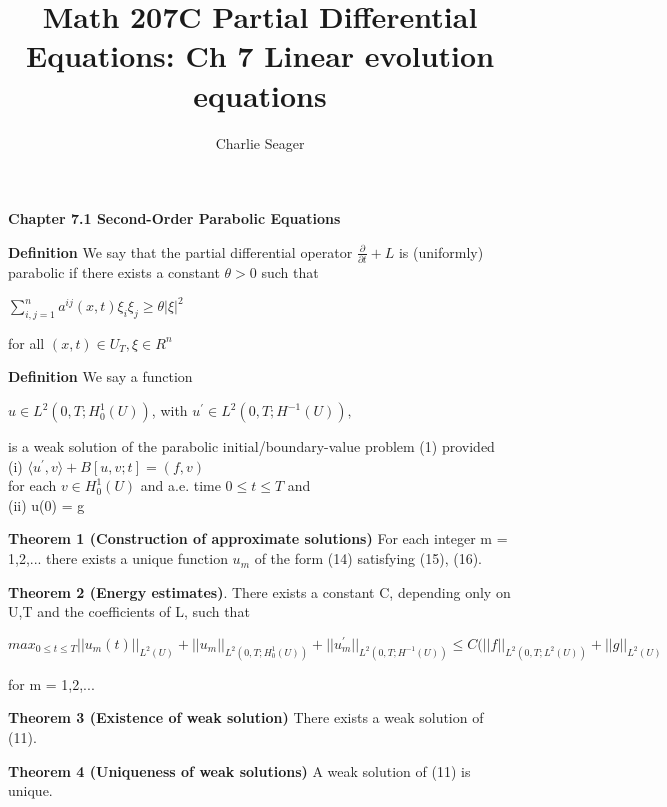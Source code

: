 \documentclass{article}
\newcommand\tab[1][1cm]{\hspace*{#1}}
\begin{document}
\title {Math 207C Partial Differential Equations: Ch 7 Linear evolution equations}

\author{Charlie Seager}

\maketitle

\textbf {Chapter 7.1 Second-Order Parabolic Equations}

\textbf {Definition} We say that the partial differential operator $\frac{\partial}{\partial t} + L$ is (uniformly) parabolic if there exists a constant $\theta > 0$ such that
\begin{center}
$\sum_{i,j=1}^n a^{ij}(x,t) \xi_i \xi_j \geq \theta |\xi|^2$
\end{center}
for all $(x,t) \in U_T, \xi \in R^n$

\textbf {Definition} We say a function
\begin{center}
$u \in L^2 (0, T; H_0^1(U))$, with $u^{'} \in L^2(0, T; H^{-1}(U)),$
\end{center}
is a weak solution of the parabolic initial/boundary-value problem (1) provided
\tab (i) $\langle u^{'}, v \rangle + B[u, v; t] = (f,v)$ \\
for each $v \in H_0^1(U)$ and a.e. time $0 \leq t \leq T$ and \\
\tab (ii) u(0) = g

\textbf {Theorem 1 (Construction of approximate solutions)} For each integer m = 1,2,... there exists a unique function $u_m$ of the form (14) satisfying (15), (16).

\textbf {Theorem 2 (Energy estimates)}. There exists a constant C, depending only on U,T and the coefficients of L, such that
\begin{center}
$max_{0 \leq t \leq T} ||u_m(t)||_{L^{2}(U)} + ||u_m||_{L^{2}(0, T; H_{0}^{1}(U))} + ||u^{'}_{m}||_{L^{2}(0, T; H^{-1}(U))} \leq C(||f||_{L^{2}(0, T; L^{2}(U))} + ||g||_{L^{2}(U)}$
\end{center}
for m = 1,2,...

\textbf {Theorem 3 (Existence of weak solution)} There exists a weak solution of (11).

\textbf {Theorem 4 (Uniqueness of weak solutions)} A weak solution of (11) is unique.
\end{document}
